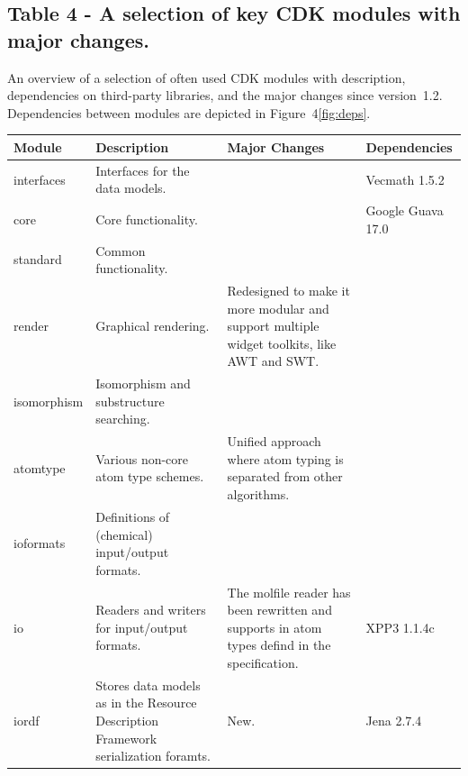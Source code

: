 \documentclass[10pt]{bmcart}
\begin{document}
\begin{backmatter}
\begin{minipage}{1\textwidth}
\begin{tabular}{lcclc}
    \end{tabular}
    \end{minipage}

      \subsection*{Table 4 - A selection of key CDK modules with major changes.}\label{tab:modules}
  An overview of a selection of often used CDK modules with description,
  dependencies on third-party libraries, and the major changes since
  version~1.2. Dependencies between modules are depicted in Figure~4\ref{fig:deps}.
  \baselineskip

    \begin{minipage}{1\textwidth}
    \renewcommand*{\thempfootnote}{\fnsymbol{mpfootnote}}
    \centering
    \begin{tabular}{lp{3cm}p{3cm}l}
  \textbf{Module}            & \textbf{Description}  & \textbf{Major Changes} & \textbf{Dependencies} \\ \hline
  interfaces                 & Interfaces for the data models. & & Vecmath 1.5.2 \\ \hline
  core                       & Core functionality.             & & Google Guava 17.0 \\ \hline %
  standard                   & Common functionality.           & & \\ \hline
  render                     & Graphical rendering.            & Redesigned to make it more modular and support multiple widget toolkits, like AWT and SWT. & \\ \hline
  isomorphism                & Isomorphism and substructure searching. & & \\ \hline
  atomtype                   & Various non-core atom type schemes.     & Unified approach where atom typing is separated from other algorithms. & \\ \hline
  ioformats                  & Definitions of (chemical) input/output formats. & & \\ \hline
  io                         & Readers and writers for input/output formats.  & The molfile reader has been rewritten and supports in atom types defind in the specification. & XPP3 1.1.4c \\ \hline
  iordf                      & Stores data models as in the Resource Description Framework serialization foramts. & New. & Jena 2.7.4 \\ \hline

\end{tabular}
\end{minipage}
\end{backmatter}
\end{document}
